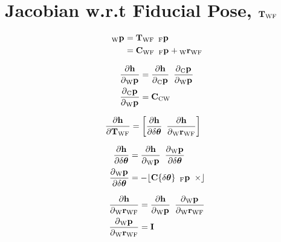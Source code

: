 \section{Jacobian w.r.t Fiducial Pose, $\Tf{\world}{\fiducial}$}

\begin{align}
\begin{split}
  \Pt{\world}
		&= \Tf{\world}{\fiducial}
			\enspace
			\Pt{\fiducial} \\
		&= \Rot{\world}{\fiducial}
			\enspace
			\Pt{\fiducial}
			+ \Trans{\world}{\fiducial}
\end{split}
\end{align}

\begin{align}
  \dfrac{\partial{\projFunc}}{\partial{\Pt{\world}}}
		&=
			\dfrac{\partial{\projFunc}}{\partial{\Pt{\cam}}}
			\enspace
			\dfrac{\partial{\Pt{\cam}}}{\partial{\Pt{\world}}} \\
  \dfrac{\partial{\Pt{\cam}}}{\partial{\Pt{\world}}}
		&= \Rot{\cam}{\world}
\end{align}

\begin{align}
	\dfrac{\partial{\projFunc}}{\partial{\Tf{\world}{\fiducial}}}
		&=
			\begin{bmatrix}
        \dfrac{\partial \projFunc}{\partial \dtheta}
				\enspace
				\dfrac{\partial \projFunc}{\partial \Pos{\world}{\fiducial}}
			\end{bmatrix}
\end{align}

\begin{align}
  \dfrac{\partial{\projFunc}}
				{\partial{\dtheta}}
		&=
			\dfrac{\partial{\projFunc}}
						{\partial{\Pt{\world}}}
			\enspace
			\dfrac{\partial{\Pt{\world}}}
						{\partial{\dtheta}} \\
  \dfrac{\partial{\Pt{\world}}}{\partial{\dtheta}}
    &= -\Skew{\rot\{\dtheta\} \enspace \Pt{\fiducial}}
\end{align}

\begin{align}
  \dfrac{\partial{\projFunc}}{\partial{\Pos{\world}{\fiducial}}}
		&=
			\dfrac{\partial{\projFunc}}{\partial{\Pt{\world}}}
			\enspace
			\dfrac{\partial{\Pt{\world}}}{\partial{\Pos{\world}{\fiducial}}} \\
  \dfrac{\partial{\Pt{\world}}}{\partial{\Pos{\world}{\fiducial}}} &= \I
\end{align}
